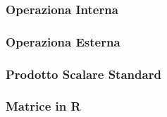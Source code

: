


\subsubsection{Operaziona Interna}



\subsubsection{Operaziona Esterna}

\subsubsection{Prodotto Scalare Standard}

\subsubsection{Matrice in R}

